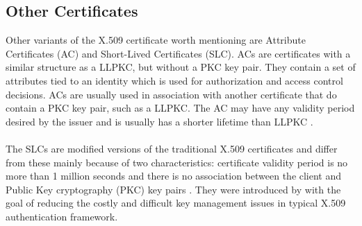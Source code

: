 \subsection{Other Certificates}
Other variants of the X.509 certificate worth mentioning are Attribute Certificates (AC) and Short-Lived Certificates (SLC). ACs are certificates with a similar structure as a LLPKC, but without a PKC key pair. They contain a set of attributes tied to an identity which is used for authorization and access control decisions. ACs are usually used in association with another certificate that do contain a PKC key pair, such as a LLPKC. The AC may have any validity period desired by the issuer and is usually has a shorter lifetime than LLPKC \cite{farrells2010rfc5755}.
\\\\
The SLCs are modified versions of the traditional X.509 certificates and differ from these mainly because of two characteristics: certificate validity period is no more than 1 million seconds and there is no association between the client and Public Key cryptography (PKC) key pairs \cite{hsu2002intranet}. They were introduced by \cite{hsu2002intranet} with the goal of reducing the costly and difficult key management issues in typical X.509 authentication framework.












